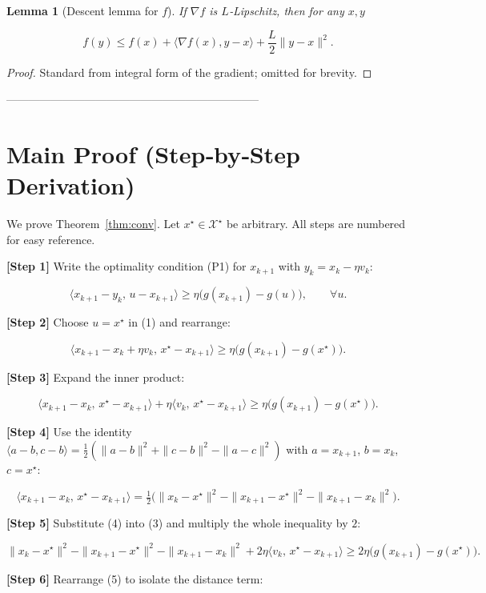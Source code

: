 \documentclass{article}
\newtheorem{lemma}{Lemma}
\begin{document}
\begin{lemma}[Descent lemma for $f$]\label{lem:descent}
If $\nabla f$ is $L$‑Lipschitz, then for any $x,y$  

\[
f(y)\le f(x)+\langle \nabla f(x),y-x\rangle+\frac{L}{2}\|y-x\|^{2}.
\tag{L1}
\]
\end{lemma}
\begin{proof}
Standard from integral form of the gradient; omitted for brevity. \end{proof}

--------------------------------------------------------------------

\section*{Main Proof (Step‑by‑Step Derivation)}
We prove Theorem~\ref{thm:conv}. Let $x^\star\in\mathcal{X}^\star$ be arbitrary.
All steps are numbered for easy reference.

\noindent\textbf{[Step 1]}  Write the optimality condition (P1) for $x_{k+1}$ with
$y_k = x_k-\eta v_k$:

\[
\langle x_{k+1}-y_k,\,u-x_{k+1}\rangle\ge \eta\bigl(g(x_{k+1})-g(u)\bigr),\qquad\forall u.
\tag{1}
\]

\noindent\textbf{[Step 2]}  Choose $u=x^\star$ in (1) and rearrange:

\[
\langle x_{k+1}-x_k+\eta v_k,\,x^\star-x_{k+1}\rangle\ge \eta\bigl(g(x_{k+1})-g(x^\star)\bigr).
\tag{2}
\]

\noindent\textbf{[Step 3]}  Expand the inner product:

\[
\langle x_{k+1}-x_k,\,x^\star-x_{k+1}\rangle
      +\eta\langle v_k,\,x^\star-x_{k+1}\rangle
\ge \eta\bigl(g(x_{k+1})-g(x^\star)\bigr).
\tag{3}
\]

\noindent\textbf{[Step 4]}  Use the identity
$\langle a-b,c-b\rangle =\tfrac12(\|a-b\|^{2}+\|c-b\|^{2}-\|a-c\|^{2})$ with
$a=x_{k+1}$, $b=x_k$, $c=x^\star$:

\[
\langle x_{k+1}-x_k,\,x^\star-x_{k+1}\rangle
   =\tfrac12\bigl(\|x_k-x^\star\|^{2}-\|x_{k+1}-x^\star\|^{2}-\|x_{k+1}-x_k\|^{2}\bigr).
\tag{4}
\]

\noindent\textbf{[Step 5]}  Substitute (4) into (3) and multiply the whole inequality by $2$:

\[
\|x_k-x^\star\|^{2}-\|x_{k+1}-x^\star\|^{2}-\|x_{k+1}-x_k\|^{2}
   +2\eta\langle v_k,\,x^\star-x_{k+1}\rangle
\ge 2\eta\bigl(g(x_{k+1})-g(x^\star)\bigr).
\tag{5}
\]

\noindent\textbf{[Step 6]}  Rearrange (5) to isolate the distance term:
\end{document}
